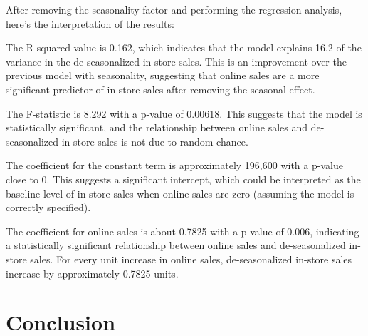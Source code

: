 \documentclass{article}
\begin{document}
After removing the seasonality factor and performing the regression analysis, here's the interpretation of the results:

The R-squared value is 0.162, which indicates that the model explains 16.2 of the variance in the de-seasonalized in-store sales. This is an improvement over the previous model with seasonality, suggesting that online sales are a more significant predictor of in-store sales after removing the seasonal effect.

The F-statistic is 8.292 with a p-value of 0.00618. This suggests that the model is statistically significant, and the relationship between online sales and de-seasonalized in-store sales is not due to random chance.

The coefficient for the constant term is approximately 196,600 with a p-value close to 0. This suggests a significant intercept, which could be interpreted as the baseline level of in-store sales when online sales are zero (assuming the model is correctly specified).

The coefficient for online sales is about 0.7825 with a p-value of 0.006, indicating a statistically significant relationship between online sales and de-seasonalized in-store sales. For every unit increase in online sales, de-seasonalized in-store sales increase by approximately 0.7825 units.

\section{Conclusion}

\newpage


\end{document}
